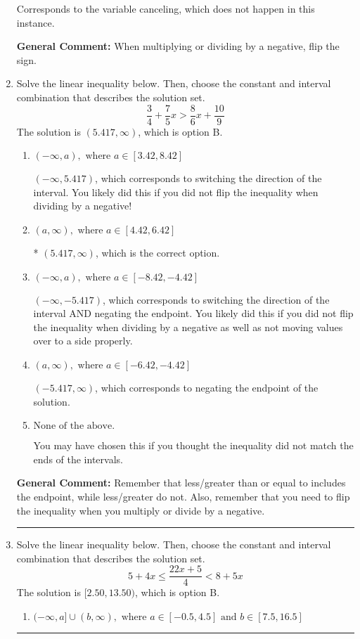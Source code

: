 \documentclass{extbook}[14pt]
\newcommand{\litem}[1]{\item #1

\rule{\textwidth}{0.4pt}}
\begin{document}
\begin{enumerate}
{\begin{enumerate}[label=\Alph*.]
Corresponds to the variable canceling, which does not happen in this instance.
\end{enumerate}

\textbf{General Comment:} When multiplying or dividing by a negative, flip the sign.
}
\litem{
Solve the linear inequality below. Then, choose the constant and interval combination that describes the solution set.
\[ \frac{3}{4} + \frac{7}{5} x > \frac{8}{6} x + \frac{10}{9} \]
The solution is \( (5.417, \infty) \), which is option B.\begin{enumerate}[label=\Alph*.]
\item \( (-\infty, a), \text{ where } a \in [3.42, 8.42] \)

 $(-\infty, 5.417)$, which corresponds to switching the direction of the interval. You likely did this if you did not flip the inequality when dividing by a negative!
\item \( (a, \infty), \text{ where } a \in [4.42, 6.42] \)

* $(5.417, \infty)$, which is the correct option.
\item \( (-\infty, a), \text{ where } a \in [-8.42, -4.42] \)

 $(-\infty, -5.417)$, which corresponds to switching the direction of the interval AND negating the endpoint. You likely did this if you did not flip the inequality when dividing by a negative as well as not moving values over to a side properly.
\item \( (a, \infty), \text{ where } a \in [-6.42, -4.42] \)

 $(-5.417, \infty)$, which corresponds to negating the endpoint of the solution.
\item \( \text{None of the above}. \)

You may have chosen this if you thought the inequality did not match the ends of the intervals.
\end{enumerate}

\textbf{General Comment:} Remember that less/greater than or equal to includes the endpoint, while less/greater do not. Also, remember that you need to flip the inequality when you multiply or divide by a negative.
}
\litem{
Solve the linear inequality below. Then, choose the constant and interval combination that describes the solution set.
\[ 5 + 4 x \leq \frac{22 x + 5}{4} < 8 + 5 x \]
The solution is \( [2.50, 13.50) \), which is option B.\begin{enumerate}[label=\Alph*.]
\item \( (-\infty, a] \cup (b, \infty), \text{ where } a \in [-0.5, 4.5] \text{ and } b \in [7.5, 16.5] \)


\end{enumerate}}
\end{enumerate}
\end{document}
